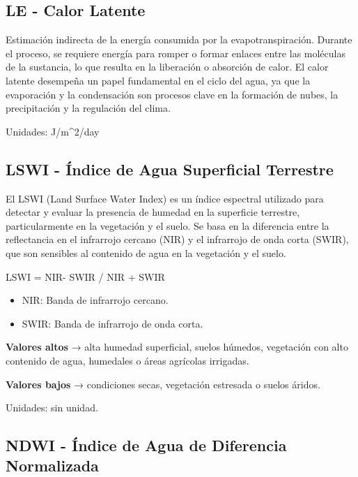 \documentclass[
]{book}
\begin{document}
\subsection{\texorpdfstring{\textbf{LE} - Calor Latente}{LE - Calor Latente}}\label{le---calor-latente}

Estimación indirecta de la energía consumida por la evapotranspiración. Durante el proceso, se requiere energía para romper o formar enlaces entre las moléculas de la sustancia, lo que resulta en la liberación o absorción de calor. El calor latente desempeña un papel fundamental en el ciclo del agua, ya que la evaporación y la condensación son procesos clave en la formación de nubes, la precipitación y la regulación del clima.

Unidades: J/m\^{}2/day

\subsection{\texorpdfstring{\textbf{LSWI} - Índice de Agua Superficial Terrestre}{LSWI - Índice de Agua Superficial Terrestre}}\label{lswi---uxedndice-de-agua-superficial-terrestre}

El LSWI (Land Surface Water Index) es un índice espectral utilizado para detectar y evaluar la presencia de humedad en la superficie terrestre, particularmente en la vegetación y el suelo. Se basa en la diferencia entre la reflectancia en el infrarrojo cercano (NIR) y el infrarrojo de onda corta (SWIR), que son sensibles al contenido de agua en la vegetación y el suelo.

LSWI = NIR- SWIR / NIR + SWIR\hspace{0pt}

\begin{itemize}
\item
  NIR: Banda de infrarrojo cercano.
\item
  SWIR: Banda de infrarrojo de onda corta.
\end{itemize}

\textbf{Valores altos} → alta humedad superficial, suelos húmedos, vegetación con alto contenido de agua, humedales o áreas agrícolas irrigadas.

\textbf{Valores bajos} → condiciones secas, vegetación estresada o suelos áridos.

Unidades: sin unidad.

\subsection{\texorpdfstring{\textbf{NDWI} - Índice de Agua de Diferencia Normalizada}{NDWI - Índice de Agua de Diferencia Normalizada}}\label{ndwi---uxedndice-de-agua-de-diferencia-normalizada}
\end{document}
